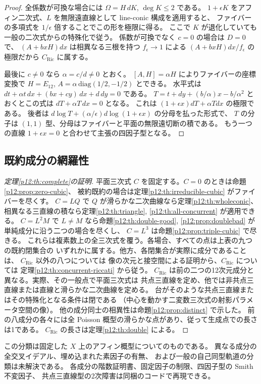 \begin{proof}
全係数が可換な場合には $\Omega=H\,dK$, $\deg K\le2$ である。
$1+\epsilon K$ をアフィン二次式、$L$ を無限遠直線として
$\mathrm{line\text{-}conic}$ 構成を適用すると、
ファイバーの多項式を $1/\epsilon$ 倍することでこの形を極限に得る。
ここで $K$ が退化していても一般の二次式からの特殊化で従う。
係数が可換でなく $c=0$ の場合は $D=0$ で、
$(A+b xH)dx$ は相異なる三根を持つ $f_\epsilon\to1$ による
$(A+b xH)dx/f_\epsilon$ の極限だから $C_{\mathrm{Ric}}$ に属する。

最後に $c\ne0$ なら $\alpha=c/d\ne0$ とおく。
$[A,H]=\alpha H$ によりファイバーの座標変換で
$H=E_{12}$, $A=\alpha\,\mathrm{diag}(1/2,-1/2)$ とできる。
水平式は $dt+\alpha t\,dx+(bx+cy)\,dx+d\,dy=0$ である。
$T=t+d y+(b/\alpha)x-b/\alpha^2$ とおくとこの式は $dT+\alpha T\,dx=0$ となる。
これは $(1+\epsilon x)dT+\alpha Tdx$ の極限である。
後者は $d\log T+(\alpha/\epsilon)d\log(1+\epsilon x)$ の分母を払った形式で、
$T$ の分子は $(1,1)$ 型、分母はファイバーと平面の無限遠切断の積である。
もう一つの直線 $1+\epsilon x=0$ と合わせて主張の四因子型となる。
\end{proof}


\subsection{既約成分の網羅性}\label{p12:sec:conclusion}
\begin{proof}[定理\ref{p12:th:complete}の証明]
平面三次式 $C$ を固定する。$C=0$ のときは命題\ref{p12:prop:zero-cubic}、
被約既約の場合は定理\ref{p12:th:irreducible-cubic} がファイバーを尽くす。
$C=LQ$ で $Q$ が滑らかな二次曲線なら定理\ref{p12:th:wholeconic}、
相異なる三直線の積なら定理\ref{p12:th:triangle}, \ref{p12:th:all-concurrent} が適用できる。
$C=L^2M$ で $L\ne M$ なら命題\ref{p12:th:double-good}, \ref{p12:prop:doublebad} が単純成分に沿う二つの場合を尽くし、
$C=L^3$ は命題\ref{p12:prop:triple-cubic} で尽きる。
これらは複素数上の全三次式を覆う。各場合、すべての点は上表の九つの既約閉集合の
いずれかに属する。他方、各閉集合が実際に成分であることは、 $C_{\mathrm{Ric}}$ 以外の八つについては
像の次元と接空間による証明から、$C_{\mathrm{Ric}}$ については
定理\ref{p12:th:concurrent-riccati} から従う。
$C_{\mathrm{Ric}}$ は前の二つの12次元成分と異なる。実際、その一般点で平面三次式は
共点三直線を定め、他では非共点三直線または直線と滑らかな二次曲線を定める。
台がそのような共点三直線またはその特殊化となる条件は閉である
（中心を動かす二変数三次式の射影パラメータ空間の像）。
他の成分同士の相異性は命題\ref{p12:prop:distinct} で示した。
前の八成分の各々には全 Poisson 概型の滑らかな点があり、従って生成点での長さは1である。
$C_{\mathrm{Ric}}$ の長さは定理\ref{p12:th:double} による。
\end{proof}

この分類は固定した $X$ 上のアフィン概型についてのものである。
異なる成分の全交叉イデアル、埋め込まれた素因子の有無、
および一般の自己同型軌道の分類は未解決である。
各成分の階数証明書、固定因子の制限、四因子型の Smith 不変因子、
共点三直線型の2次障害は同梱のコードで再現できる。
